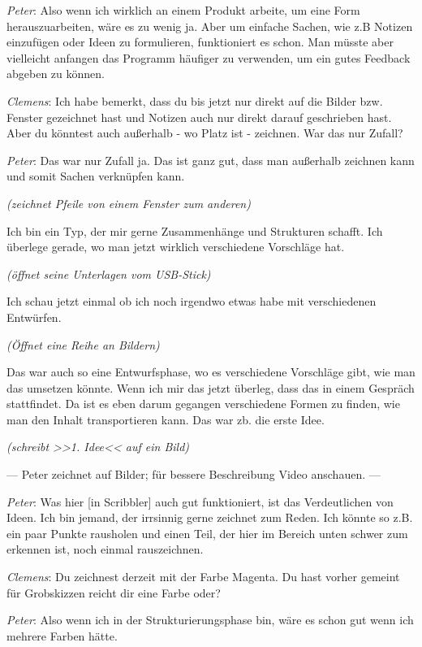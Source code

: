 \medskip \emph{Peter}: Also wenn ich wirklich an einem Produkt arbeite, um eine Form herauszuarbeiten, wäre es zu wenig ja. Aber um einfache Sachen, wie z.B Notizen einzufügen oder Ideen zu formulieren, funktioniert es schon. Man müsste aber vielleicht anfangen das Programm häufiger zu verwenden, um ein gutes Feedback abgeben zu können.

\medskip \emph{Clemens}: Ich habe bemerkt, dass du bis jetzt nur direkt auf die Bilder bzw. Fenster gezeichnet hast und Notizen auch nur direkt darauf geschrieben hast. Aber du könntest auch außerhalb - wo Platz ist - zeichnen. War das nur Zufall?

\medskip \emph{Peter}: Das war nur Zufall ja. Das ist ganz gut, dass man außerhalb zeichnen kann und somit Sachen verknüpfen kann. 

\smallskip \emph{(zeichnet Pfeile von einem Fenster zum anderen)}

\smallskip Ich bin ein Typ, der mir gerne Zusammenhänge und Strukturen schafft.
Ich überlege gerade, wo man jetzt wirklich verschiedene Vorschläge hat.

\smallskip \emph{(öffnet seine Unterlagen vom USB-Stick)} 

\smallskip Ich schau jetzt einmal ob ich noch irgendwo etwas habe mit verschiedenen Entwürfen. 

\smallskip \emph{(Öffnet eine Reihe an Bildern)}

\smallskip Das war auch so eine Entwurfsphase, wo es verschiedene Vorschläge gibt, wie man das umsetzen könnte. Wenn ich mir das jetzt überleg, dass das in einem Gespräch stattfindet. Da ist es eben darum gegangen verschiedene Formen zu finden, wie man den Inhalt transportieren kann. Das war zb. die erste Idee.

\smallskip \emph{(schreibt >>1. Idee<< auf ein Bild)}

\smallskip --- Peter zeichnet auf Bilder; für bessere Beschreibung Video anschauen. ---

\medskip \emph{Peter}: Was hier [in Scribbler] auch gut funktioniert, ist das Verdeutlichen von Ideen. Ich bin jemand, der irrsinnig gerne zeichnet zum Reden. Ich könnte so z.B. ein paar Punkte rausholen und einen Teil, der hier im Bereich unten schwer zum erkennen ist, noch einmal rauszeichnen.

\medskip \emph{Clemens}: Du zeichnest derzeit mit der Farbe Magenta. Du hast vorher gemeint für Grobskizzen reicht dir eine Farbe oder?

\medskip \emph{Peter}: Also wenn ich in der Strukturierungsphase bin, wäre es schon gut wenn ich mehrere Farben hätte.

